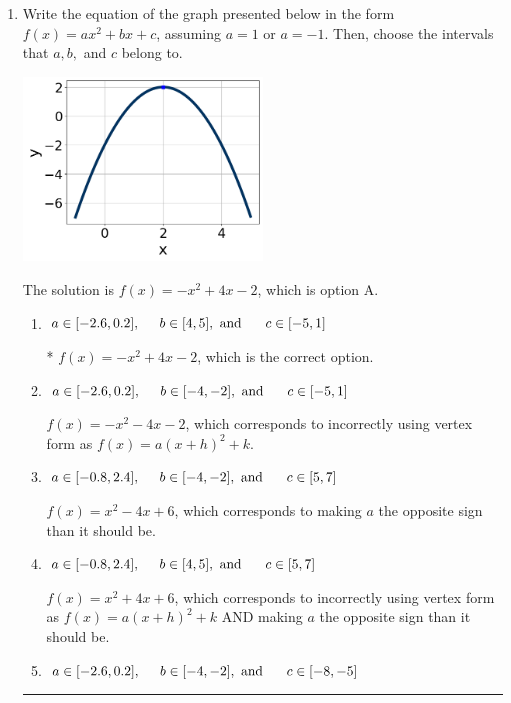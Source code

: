 \documentclass{extbook}[14pt]
\newcommand{\litem}[1]{\item #1

\rule{\textwidth}{0.4pt}}
\begin{document}
\begin{enumerate}\litem{
Write the equation of the graph presented below in the form $f(x)=ax^2+bx+c$, assuming  $a=1$ or $a=-1$. Then, choose the intervals that $a, b,$ and $c$ belong to.

\begin{center}
    \includegraphics[width=0.5\textwidth]{../Figures/quadraticGraphToEquationA.png}
\end{center}




The solution is \( f(x) = -x^{2} +4 x -2 \), which is option A.\begin{enumerate}[label=\Alph*.]
\item \( a \in [-2.6, 0.2], \hspace*{5mm} b \in [4, 5], \text{ and } \hspace*{5mm} c \in [-5, 1] \)

* $f(x)=-x^{2} +4 x -2$, which is the correct option.
\item \( a \in [-2.6, 0.2], \hspace*{5mm} b \in [-4, -2], \text{ and } \hspace*{5mm} c \in [-5, 1] \)

$f(x)=-x^{2} -4 x -2$, which corresponds to incorrectly using vertex form as $f(x) = a(x+h)^2+k$.
\item \( a \in [-0.8, 2.4], \hspace*{5mm} b \in [-4, -2], \text{ and } \hspace*{5mm} c \in [5, 7] \)

$f(x)=x^{2} -4 x + 6$, which corresponds to making $a$ the opposite sign than it should be.
\item \( a \in [-0.8, 2.4], \hspace*{5mm} b \in [4, 5], \text{ and } \hspace*{5mm} c \in [5, 7] \)

$f(x)=x^{2} +4 x + 6$, which corresponds to incorrectly using vertex form as $f(x) = a(x+h)^2+k$ AND making $a$ the opposite sign than it should be.
\item \( a \in [-2.6, 0.2], \hspace*{5mm} b \in [-4, -2], \text{ and } \hspace*{5mm} c \in [-8, -5] \)


\end{enumerate}}
\end{enumerate}
\end{document}
